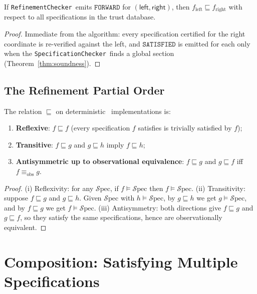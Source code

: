 \documentclass[11pt]{article}
\newcommand{\Spec}{\mathcal{S}\mathrm{pec}}        %
\newcommand{\Refine}{\sqsubseteq}                   %
\newcommand{\SAT}{\texttt{SATISFIED}}               %
\newcommand{\SpecificationChecker}{\texttt{SpecificationChecker}}
\newcommand{\RefinementChecker}{\texttt{RefinementChecker}}
\begin{document}
\begin{theorem}\label{thm:refinement-soundness}
If \RefinementChecker\ emits $\texttt{FORWARD}$ for $(\mathsf{left},
\mathsf{right})$, then $f_{\mathrm{left}} \Refine f_{\mathrm{right}}$
with respect to all specifications in the trust database.
\end{theorem}
\begin{proof}
Immediate from the algorithm: every specification certified for the
right coordinate is re-verified against the left, and $\SAT$ is
emitted for each only when the \SpecificationChecker\ finds a global
section (Theorem~\ref{thm:soundness}).
\end{proof}

\subsection{The Refinement Partial Order}\label{sec:refine-order}

\begin{theorem}\label{thm:refinement-order}
The relation $\Refine$ on deterministic \Python\ implementations is:
\begin{enumerate}[leftmargin=2em,label=(\roman*)]
  \item \textbf{Reflexive}: $f \Refine f$ (every specification $f$
        satisfies is trivially satisfied by $f$);
  \item \textbf{Transitive}: $f \Refine g$ and $g \Refine h$
        imply $f \Refine h$;
  \item \textbf{Antisymmetric up to observational equivalence}:
        $f \Refine g$ and $g \Refine f$ iff $f \equiv_{\mathrm{obs}} g$.
\end{enumerate}
\end{theorem}
\begin{proof}
(i) Reflexivity: for any $\Spec$, if $f \models \Spec$ then
$f \models \Spec$.
(ii) Transitivity: suppose $f \Refine g$ and $g \Refine h$.
Given $\Spec$ with $h \models \Spec$, by $g \Refine h$ we get
$g \models \Spec$, and by $f \Refine g$ we get $f \models \Spec$.
(iii) Antisymmetry: both directions give $f \Refine g$ and
$g \Refine f$, so they satisfy the same specifications, hence are
observationally equivalent.
\end{proof}

\section{Composition: Satisfying Multiple Specifications}\label{sec:composition}
\end{document}
